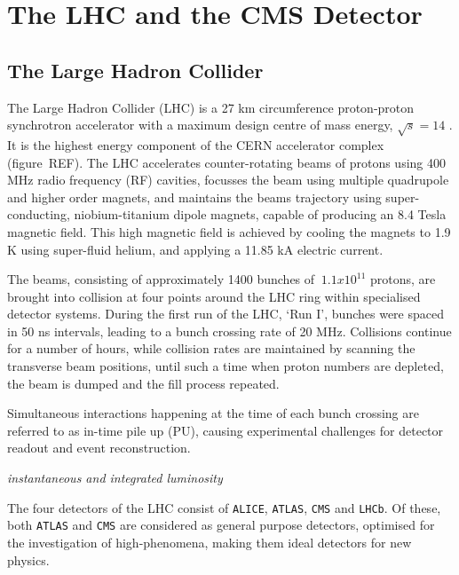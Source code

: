 \chapter{The LHC and the CMS Detector}

\ifpdf
    \graphicspath{{Chapter3/Figs/Raster/}{Chapter3/Figs/PDF/}{Chapter3/Figs/}}
\else
    \graphicspath{{Chapter3/Figs/Vector/}{Chapter3/Figs/}}
\fi


\section{The Large Hadron Collider}  %
\label{sec:detector_lhc}

The Large Hadron Collider (LHC) is a 27 km circumference proton-proton 
synchrotron accelerator with a maximum design centre of mass energy,
$\sqrt{s} = 14$ \tev. It is the highest energy component of the CERN accelerator
complex (figure~REF). The LHC accelerates counter-rotating beams of protons 
using 400 MHz radio frequency
(RF) cavities, focusses the beam using multiple quadrupole and higher order magnets,
and maintains the beams trajectory using super-conducting, niobium-titanium 
dipole magnets, capable of producing an 8.4 Tesla magnetic field. This high 
magnetic field is achieved by cooling the magnets to 1.9 K using super-fluid 
helium, and applying a 11.85 kA electric current.

The beams, consisting of approximately 1400 bunches of $~1.1x10^{11}$ protons,
are brought into collision
at four points around the LHC ring within specialised detector systems. During the
first run of the LHC, `Run I', bunches were spaced in 50 ns intervals, leading to
a bunch crossing rate of 20 MHz. Collisions continue for a number of hours, 
while collision rates are maintained by scanning the transverse beam positions, 
until such a time when proton numbers are depleted, the beam is dumped and the 
fill process repeated.

Simultaneous interactions happening at the time
of each bunch crossing are referred to as in-time pile up (PU), 
causing experimental challenges for detector readout and event reconstruction.

\emph{instantaneous and integrated luminosity}

The four detectors of the LHC consist of \texttt{ALICE}, \texttt{ATLAS},
\texttt{CMS} and \texttt{LHCb}. Of these, both \texttt{ATLAS} and \texttt{CMS} 
are considered as general purpose detectors, optimised for the investigation of
high-\Pt phenomena, making them ideal detectors for new physics.

